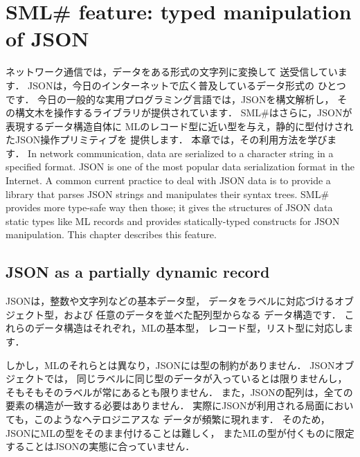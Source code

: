 \documentclass{jbook}
\newcommand{\txt}[2]{#2}
\newcommand{\smlsharp}{SML\#}
\begin{document}
\chapter{
\txt{\smlsharp{}の拡張機能：JSONの型付き操作}
    {\smlsharp{} feature: typed manipulation of JSON}
}

\ifjp%
	ネットワーク通信では，データをある形式の文字列に変換して
送受信しています．
	JSONは，今日のインターネットで広く普及しているデータ形式の
ひとつです．
	今日の一般的な実用プログラミング言語では，JSONを構文解析し，
その構文木を操作するライブラリが提供されています．
	\smlsharp{}はさらに，JSONが表現するデータ構造自体に
MLのレコード型に近い型を与え，静的に型付けされたJSON操作プリミティブを
提供します．
	本章では，その利用方法を学びます．
\else%
	In network communication,
data are serialized to a character string in a specified format.
	JSON is one of the most popular data serialization format
in the Internet.
	A common current practice to deal with JSON data is to provide
a library that parses JSON strings and manipulates their syntax trees.
	\smlsharp{} provides more type-safe way then those;
it gives the structures of JSON data static types like ML records
and provides statically-typed constructs for JSON manipulation.
	This chapter describes this feature.
\fi%

\section{
\txt{JSONと部分動的レコード}
    {JSON as a partially dynamic record}
}

\ifjp%
	JSONは，整数や文字列などの基本データ型，
データをラベルに対応づけるオブジェクト型，および
任意のデータを並べた配列型からなる
データ構造です．
	これらのデータ構造はそれぞれ，MLの基本型，
レコード型，リスト型に対応します．

	しかし，MLのそれらとは異なり，JSONには型の制約がありません．
	JSONオブジェクトでは，
同じラベルに同じ型のデータが入っているとは限りませんし，
そもそもそのラベルが常にあるとも限りません．
	また，JSONの配列は，全ての要素の構造が一致する必要はありません．
	実際にJSONが利用される局面においても，このようなヘテロジニアスな
データが頻繁に現れます．
	そのため，JSONにMLの型をそのまま付けることは難しく，
またMLの型が付くものに限定することはJSONの実態に合っていません．
\end{document}
